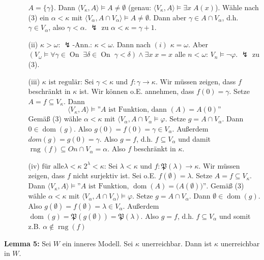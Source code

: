 \documentclass[a4paper,fontsize=11pt]{scrartcl}
\newcommand{\rng}{\operatorname{rng}}
\newcommand{\On}{\operatorname{On}}
\newcommand{\dom}{\operatorname{dom}}
\begin{document}
\begin{itemize}
\begin{itemize}
    $A=\{\gamma\}$.  Dann $\langle V_{\kappa},A\rangle\models
    A\neq\emptyset$ (genau: $\langle V_{\kappa},A\rangle\models
    \exists x\; A(x)$). Wähle nach (3) ein $\alpha<\kappa$ mit
    $\langle V_{\alpha}, A\cap V_{\alpha}\rangle\models A\neq
    \emptyset$.  Dann aber $\gamma \in A\cap V_{\alpha}$, d.h. $\gamma
    \in V_{\alpha}$, also $\gamma<\alpha$.  $\lightning$ zu
    $\alpha<\kappa=\gamma+1$.
  \item[(ii)] $\kappa>\omega$: $\lightning$-Ann.: $\kappa<\omega$.
    Dann nach $(i)$ $\kappa=\omega$.  Aber
    $(V_{\omega}\models\forall\gamma\in\On\; \exists \delta\in\On\;
    \gamma<\delta)\land \exists x\; x=x$ %
    alle $n<\omega$: $V_n\models \neg\varphi$.  $\lightning$ zu (3).
  \item[(iii)] $\kappa\mbox{ ist regulär}$: Sei $\gamma<\kappa$ und
    $f\colon\gamma\to\kappa$.  Wir müssen zeigen, dass $f$ beschränkt
    in $\kappa$ ist.  Wir können o.E. annehmen, dass $f(0)=\gamma$.
    Setze $A=f\subseteq V_{\kappa}$.  Dann \[\langle
    V_{\kappa},A\rangle\models \mbox{''$A$ ist Funktion, dann
      $(A)=A(0)$''}\] Gemäß (3) wähle $\alpha<\kappa$ mit $\langle
    V_{\alpha}, A\cap V_{\alpha}\models \varphi$.  Setze $g=A\cap
    V_{\alpha}$.  Dann $0\in\dom(g)$.  Also $g(0)=f(0)=\gamma \in
    V_{\alpha}$.  Außerdem $dom(g)=g(0)=\gamma$.  Also $g=f$,
    d.h. $f\subseteq V_{\alpha}$ und damit $\rng(f)\subseteq On\cap
    V_{\alpha}=\alpha$.  Also $f$ beschränkt in $\kappa$.
  \item[(iv)] $\mbox{für alle} \lambda<\kappa \; 2^{\lambda}<\kappa$:
    Sei $\lambda<\kappa$ und $f\colon \mathfrak P(\lambda)\to\kappa$.
    Wir müssen zeigen, dass $f$ nicht surjektiv ist.  Sei
    o.E. $f(\emptyset)=\lambda$.  Setze $A=f\subseteq V_{\kappa}$.
    Dann $\langle V_{\kappa}, A\rangle\models \mbox{''$A$ ist
      Funktion, $\dom(A)=\mathfrak(A(\emptyset))$''}$.  Gemäß (3)
    wähle $\alpha<\kappa$ mit $\langle V_{\alpha}, A\cap
    V_{\alpha}\rangle\models\varphi$.  Setze $g=A\cap V_{\alpha}$.
    Dann $\emptyset\in\dom(g)$.  Also
    $g(\emptyset)=f(\emptyset)=\lambda\in V_{\alpha}$.  Außerdem
    $\dom(g)=\mathfrak P(g(\emptyset)) = \mathfrak P(\lambda)$.  Also
    $g=f$, d.h. $f\subseteq V_{\alpha}$ und somit
    z.B. $\alpha\not\in\rng(f)$
  \end{itemize}
\end{itemize}

{\bf Lemma 5:} Sei $W$ ein inneres Modell. Sei $\kappa$
unerreichbar. Dann ist $\kappa$ unerreichbar in $W$.
\end{document}
